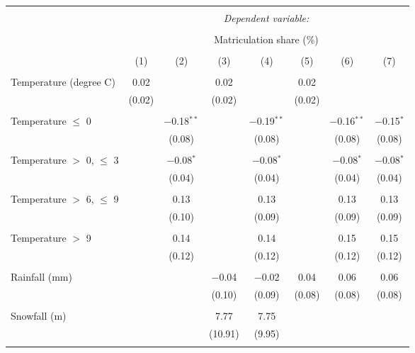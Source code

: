 
\begin{tabular}{@{\extracolsep{5pt}}lccccccc} 
\\[-1.8ex]\hline 
\hline \\[-1.8ex] 
 & \multicolumn{7}{c}{\textit{Dependent variable:}} \\ 
\cline{2-8} 
\\[-1.8ex] & \multicolumn{7}{c}{Matriculation share (\%)} \\ 
\\[-1.8ex] & (1) & (2) & (3) & (4) & (5) & (6) & (7)\\ 
\hline \\[-1.8ex] 
 Temperature (degree C) & 0.02 &  & 0.02 &  & 0.02 &  &  \\ 
  & (0.02) &  & (0.02) &  & (0.02) &  &  \\ 
  & & & & & & & \\ 
 Temperature $\le$ 0 &  & $-$0.18$^{**}$ &  & $-$0.19$^{**}$ &  & $-$0.16$^{**}$ & $-$0.15$^{*}$ \\ 
  &  & (0.08) &  & (0.08) &  & (0.08) & (0.08) \\ 
  & & & & & & & \\ 
 Temperature $>$ 0, $\le$ 3 &  & $-$0.08$^{*}$ &  & $-$0.08$^{*}$ &  & $-$0.08$^{*}$ & $-$0.08$^{*}$ \\ 
  &  & (0.04) &  & (0.04) &  & (0.04) & (0.04) \\ 
  & & & & & & & \\ 
 Temperature $>$ 6, $\le$ 9 &  & 0.13 &  & 0.13 &  & 0.13 & 0.13 \\ 
  &  & (0.10) &  & (0.09) &  & (0.09) & (0.09) \\ 
  & & & & & & & \\ 
 Temperature $>$ 9 &  & 0.14 &  & 0.14 &  & 0.15 & 0.15 \\ 
  &  & (0.12) &  & (0.12) &  & (0.12) & (0.12) \\ 
  & & & & & & & \\ 
 Rainfall (mm) &  &  & $-$0.04 & $-$0.02 & 0.04 & 0.06 & 0.06 \\ 
  &  &  & (0.10) & (0.09) & (0.08) & (0.08) & (0.08) \\ 
  & & & & & & & \\ 
 Snowfall (m) &  &  & 7.77 & 7.75 &  &  &  \\ 
  &  &  & (10.91) & (9.95) &  &  &  \\ 
  & & & & & & & \\ 

\end{tabular}
